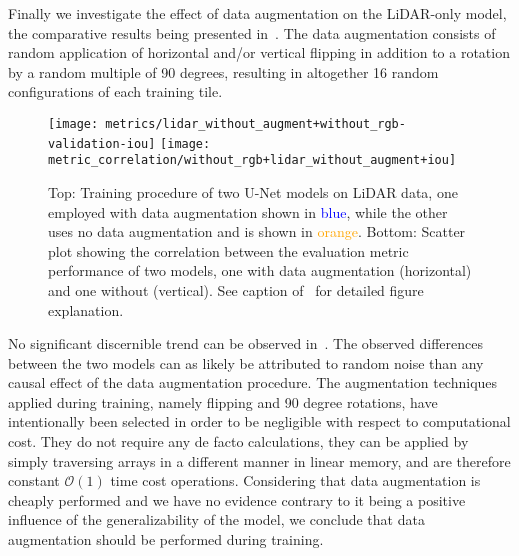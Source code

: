 
Finally we investigate the effect of data augmentation on the LiDAR-only model, the comparative results being presented in~.
The data augmentation consists of random application of horizontal and/or vertical flipping in addition to a rotation by a random multiple of 90 degrees, resulting in altogether 16 random configurations of each training tile.

\begin{figure}[H]
  \centering
  \texttt{[image: metrics/lidar\_without\_augment+without\_rgb-validation-iou]}
  \texttt{[image: metric\_correlation/without\_rgb+lidar\_without\_augment+iou]}
  \hspace{-0.9em}
  \caption{%
    Top: Training procedure of two U-Net models on LiDAR data, one employed with data augmentation shown in \textcolor{blue}{blue}, while the other uses no data augmentation and is shown in \textcolor{orange}{orange}.
    Bottom: Scatter plot showing the correlation between the evaluation metric performance of two models, one with data augmentation (horizontal) and one without (vertical).
    See caption of~ for detailed figure explanation.
  }%
  \label{fig:data-augmentation-experiment}
\end{figure}

No significant discernible trend can be observed in~.
The observed differences between the two models can as likely be attributed to random noise than any causal effect of the data augmentation procedure.
The augmentation techniques applied during training, namely flipping and 90 degree rotations, have intentionally been selected in order to be negligible with respect to computational cost.
They do not require any de facto calculations, they can be applied by simply traversing arrays in a different manner in linear memory, and are therefore constant $\mathcal{O}(1)$ time cost operations.
Considering that data augmentation is cheaply performed and we have no evidence contrary to it being a positive influence of the generalizability of the model, we conclude that data augmentation should be performed during training.

